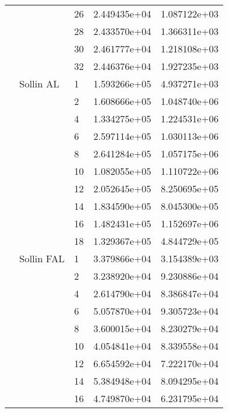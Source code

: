 \begin{tabular}{lllrr}
                      &            & 26 &  2.449435e+04 &  1.087122e+03 \\
                      &            & 28 &  2.433570e+04 &  1.366311e+03 \\
                      &            & 30 &  2.461777e+04 &  1.218108e+03 \\
                      &            & 32 &  2.446376e+04 &  1.927235e+03 \\
                      & Sollin AL & 1  &  1.593266e+05 &  4.937271e+03 \\
                      &            & 2  &  1.608666e+05 &  1.048740e+06 \\
                      &            & 4  &  1.334275e+05 &  1.224531e+06 \\
                      &            & 6  &  2.597114e+05 &  1.030113e+06 \\
                      &            & 8  &  2.641284e+05 &  1.057175e+06 \\
                      &            & 10 &  1.082055e+05 &  1.110722e+06 \\
                      &            & 12 &  2.052645e+05 &  8.250695e+05 \\
                      &            & 14 &  1.834590e+05 &  8.045300e+05 \\
                      &            & 16 &  1.482431e+05 &  1.152697e+06 \\
                      &            & 18 &  1.329367e+05 &  4.844729e+05 \\
                      & Sollin FAL & 1  &  3.379866e+04 &  3.154389e+03 \\
                      &            & 2  &  3.238920e+04 &  9.230886e+04 \\
                      &            & 4  &  2.614790e+04 &  8.386847e+04 \\
                      &            & 6  &  5.057870e+04 &  9.305723e+04 \\
                      &            & 8  &  3.600015e+04 &  8.230279e+04 \\
                      &            & 10 &  4.054841e+04 &  8.339558e+04 \\
                      &            & 12 &  6.654592e+04 &  7.222170e+04 \\
                      &            & 14 &  5.384948e+04 &  8.094295e+04 \\
                      &            & 16 &  4.749870e+04 &  6.231795e+04 \\

\end{tabular}
